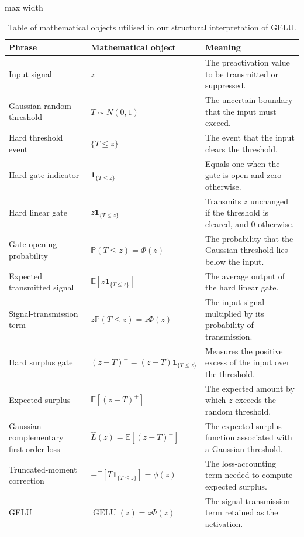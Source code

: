 \documentclass[11pt]{article}
\begin{document}
\begin{table}[tbp]
\centering
\small
\begin{adjustbox}{max width=\textwidth}
\begin{tabular}{@{}lll@{}}
\toprule
Phrase & Mathematical object & Meaning \\
\midrule
Input signal
&
$z$
&
The preactivation value to be transmitted or suppressed.
\\
Gaussian random threshold
&
$T\sim N(0,1)$
&
The uncertain boundary that the input must exceed.
\\
Hard threshold event
&
$\{T\le z\}$
&
The event that the input clears the threshold.
\\
Hard gate indicator
&
$\mathbf{1}_{\{T\le z\}}$
&
Equals one when the gate is open and zero otherwise.
\\
Hard linear gate
&
$z\mathbf{1}_{\{T\le z\}}$
&
Transmits $z$ unchanged if the threshold is cleared, and 0 otherwise.
\\
Gate-opening probability
&
$\mathbb{P}(T\le z)=\Phi(z)$
&
The probability that the Gaussian threshold lies below the input.
\\
Expected transmitted signal
&
$\mathbb{E}\!\left[z\mathbf{1}_{\{T\le z\}}\right]$
&
The average output of the hard linear gate.
\\
Signal-transmission term
&
$z\mathbb{P}(T\le z)=z\Phi(z)$
&
The input signal multiplied by its probability of transmission.
\\
Hard surplus gate
&
$(z-T)^+=(z-T)\mathbf{1}_{\{T\le z\}}$
&
Measures the positive excess of the input over the threshold.
\\
Expected surplus
&
$\mathbb{E}[(z-T)^+]$
&
The expected amount by which $z$ exceeds the random threshold.
\\
Gaussian complementary first-order loss
&
$\widehat{L}(z)=\mathbb{E}[(z-T)^+]$
&
The expected-surplus function associated with a Gaussian threshold.
\\
Truncated-moment correction
&
$-\mathbb{E}\!\left[T\mathbf{1}_{\{T\le z\}}\right]=\phi(z)$
&
The loss-accounting term needed to compute expected surplus.
\\
GELU
&
$\operatorname{GELU}(z)=z\Phi(z)$
&
The signal-transmission term retained as the activation.
\\
\bottomrule
\end{tabular}
\end{adjustbox}
\caption{Table of mathematical objects utilised in our structural interpretation of GELU.}
\label{tab:gelu-statement-decomposition}
\end{table}



\end{document}
